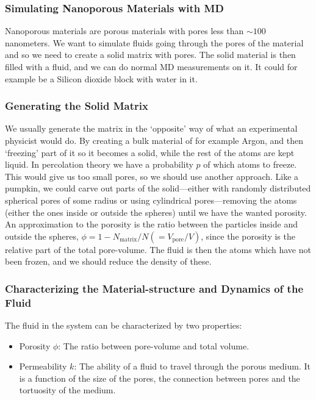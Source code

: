 \documentclass[11pt]{article}
\numberwithin{equation}{section}
\numberwithin{figure}{section}
\begin{document}
\subsubsection{Simulating Nanoporous Materials with MD}
Nanoporous materials are porous materials with pores
less than $\sim 100 $ nanometers.
We want to simulate fluids going through the pores of the material
and so we need to create a solid matrix with pores.
The solid material is then filled with a fluid, and
we can do normal MD measurements on it.
It could for example be a Silicon dioxide block with water in it.

\subsubsection{Generating the Solid Matrix}
We usually generate the matrix in the `opposite' way of what an
experimental physicist would do.
By creating a bulk material of for example Argon, and then
`freezing' part of it so it becomes a solid, while the
rest of the atoms are kept liquid.
In percolation theory we have a probability $p$ of which atoms
to freeze. This would give us too small pores, so we should use another
approach. Like a pumpkin, we could carve out parts of the
solid---either with randomly distributed spherical pores of some radius
or using cylindrical pores---removing the atoms 
(either the ones inside or outside the spheres) until we have
the wanted porosity. An approximation to the porosity is
the ratio between the particles inside and outside the spheres,
$\phi = 1 - N_{\text{matrix}}/N (= V_{\text{pore}}/V)$,
since the porosity is the relative part of the total pore-volume.
The fluid is then the atoms which have not been frozen,
and we should reduce the density of these.

\subsubsection{Characterizing the Material-structure 
    and Dynamics of the Fluid}
The fluid in the system can be characterized by
two properties:
\begin{itemize}
    \item Porosity $\phi$: The ratio between pore-volume and
        total volume.
    \item Permeability $k$: The ability of a fluid to travel
        through the porous medium. It is a function of
        the size of the pores, the connection between pores
        and the tortuosity of the medium.
\end{itemize}
\end{document}
